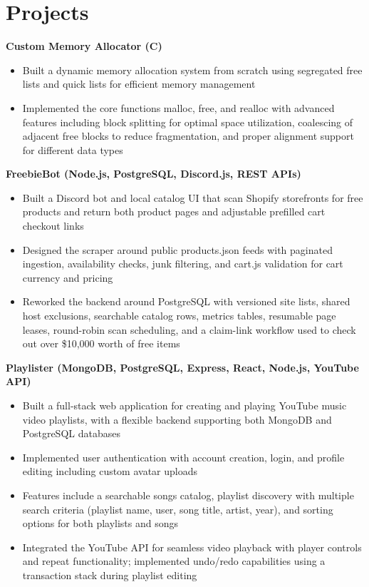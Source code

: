 \documentclass[a4paper,10pt]{article}
\begin{document}
\section*{Projects}
\noindent\textbf{Custom Memory Allocator (C)}
\begin{itemize}
\item Built a dynamic memory allocation system from scratch using segregated free lists and quick lists for efficient memory management
\item Implemented the core functions malloc, free, and realloc with advanced features including block splitting for optimal space utilization, coalescing of adjacent free blocks to reduce fragmentation, and proper alignment support for different data types
\end{itemize}
\noindent\textbf{FreebieBot (Node.js, PostgreSQL, Discord.js, REST APIs)}
\begin{itemize}
\item Built a Discord bot and local catalog UI that scan Shopify storefronts for free products and return both product pages and adjustable prefilled cart checkout links
\item Designed the scraper around public products.json feeds with paginated ingestion, availability checks, junk filtering, and cart.js validation for cart currency and pricing
\item Reworked the backend around PostgreSQL with versioned site lists, shared host exclusions, searchable catalog rows, metrics tables, resumable page leases, round-robin scan scheduling, and a claim-link workflow used to check out over \$10,000 worth of free items
\end{itemize}
\noindent\textbf{Playlister (MongoDB, PostgreSQL, Express, React, Node.js, YouTube API)}
\begin{itemize}
\item Built a full-stack web application for creating and playing YouTube music video playlists, with a flexible backend supporting both MongoDB and PostgreSQL databases
\item Implemented user authentication with account creation, login, and profile editing including custom avatar uploads
\item Features include a searchable songs catalog, playlist discovery with multiple search criteria (playlist name, user, song title, artist, year), and sorting options for both playlists and songs
\item Integrated the YouTube API for seamless video playback with player controls and repeat functionality; implemented undo/redo capabilities using a transaction stack during playlist editing
\end{itemize}
\end{document}
